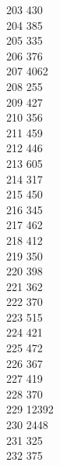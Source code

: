 { 203	430 \\
 204	385 \\
 205	335 \\
 206	376 \\
 207	4062 \\
 208	255 \\
 209	427 \\
 210	356 \\
 211	459 \\
 212	446 \\
 213	605 \\
 214	317 \\
 215	450 \\
 216	345 \\
 217	462 \\
 218	412 \\
 219	350 \\
 220	398 \\
 221	362 \\
 222	370 \\
 223	515 \\
 224	421 \\
 225	472 \\
 226	367 \\
 227	419 \\
 228	370 \\
 229	12392 \\
 230	2448 \\
 231	325 \\
 232	375 \\
}
